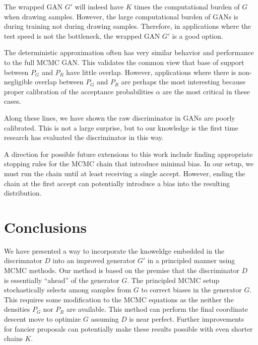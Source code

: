 \documentclass{article}
\begin{document}
The wrapped GAN $G'$ will indeed have $K$ times the computational burden of $G$ when drawing samples.
However, the large computational burden of GANs is during training not during drawing samples.
Therefore, in applications where the test speed is not the bottleneck, the wrapped GAN $G'$ is a good option.

The deterministic approximation often has very similar behavior and performance to the full MCMC GAN\@.
This validates the common view that base of support between $P_G$ and $P_R$ have little overlap.
However, applications where there is non-negligible overlap between $P_G$ and $P_R$ are perhaps the most interesting because proper calibration of the acceptance probabilities $\alpha$ are the most critical in these cases.

Along these lines, we have shown the raw discriminator in GANs are poorly calibrated.
This is not a large surprise, but to our knowledge is the first time research has evaluated the discriminator in this way.

A direction for possible future extensions to this work include finding appropriate stopping rules for the MCMC chain that introduce minimal bias.
In our setup, we must run the chain until at least receiving a single accept.
However, ending the chain at the first accept can potentially introduce a bias into the resulting distribution.

\section{Conclusions}

We have presented a way to incorporate the knoweldge embedded in the discrimnator $D$ into an improved generator $G'$ in a principled manner using MCMC methods.
Our method is based on the premise that the discriminator $D$ is essentially ``ahead'' of the generator $G$.
The principled MCMC setup stochastically selects among samples from $G$ to correct biases in the generator $G$.
This requires some modification to the MCMC equations as the neither the densities $P_G$ nor $P_R$ are available.
This method can perform the final coordinate descent move to optimize $G$ assuming $D$ is near perfect.
Further improvements for fancier proposals can potentially make these results possible with even shorter chains $K$.
\end{document}
